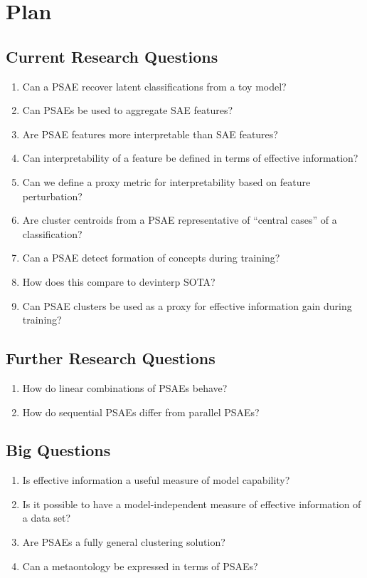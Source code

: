 
\section{Plan}

\subsection{Current Research Questions}
\begin{enumerate}
    \item Can a PSAE recover latent classifications from a toy model?
    \item Can PSAEs be used to aggregate SAE features?
    \item Are PSAE features more interpretable than SAE features?
    \item Can interpretability of a feature be defined in terms of effective information?
    \item Can we define a proxy metric for interpretability based on feature perturbation?
    \item Are cluster centroids from a PSAE representative of ``central cases'' of a classification?
    \item Can a PSAE detect formation of concepts during training?
    \item How does this compare to devinterp SOTA?
    \item Can PSAE clusters be used as a proxy for effective information gain during training?
\end{enumerate}

\subsection{Further Research Questions}
\begin{enumerate}
    \item How do linear combinations of PSAEs behave?
    \item How do sequential PSAEs differ from parallel PSAEs?
\end{enumerate}

\subsection{Big Questions}
\begin{enumerate}
    \item Is effective information a useful measure of model capability?
    \item Is it possible to have a model-independent measure of effective information of a data set?
    \item Are PSAEs a fully general clustering solution?
    \item Can a metaontology be expressed in terms of PSAEs?
\end{enumerate}

